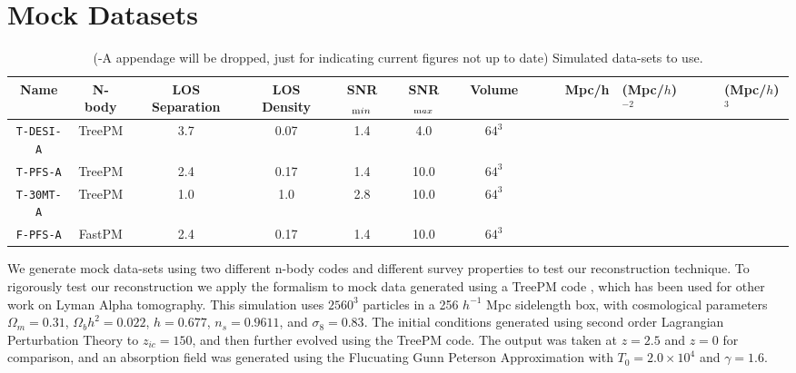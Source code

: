 \documentclass[times]{aastex62}
\begin{document}
\section{Mock Datasets}
\label{sec:mocks}
\begin{table}
  \begin{center}
    \label{tab:table1}
    \begin{tabular}{c|c|c|c|c|c|c} %
      \textbf{Name} & \textbf{N-body} & \textbf{LOS Separation} &\textbf{LOS Density} & \textbf{SNR$_{\textrm min}$} &\textbf{SNR$_{\textrm max}$} & \textbf{Volume} \ \
      &  & & Mpc/h &  (Mpc/$h$)$^{-2}$ & & & (Mpc/$h$)$^3$ \\
      \hline
    \hline
        \texttt{T-DESI-A} & TreePM & 3.7 & 0.07 & 1.4 & 4.0 & $64^3$\\
        \texttt{T-PFS-A} & TreePM & 2.4 & 0.17 & 1.4 & 10.0 & $64^3$ \\
        \texttt{T-30MT-A} & TreePM & 1.0 & 1.0 & 2.8 & 10.0 & $64^3$ \\
        \texttt{F-PFS-A} & FastPM & 2.4 & 0.17 & 1.4 & 10.0 & $64^3$\\
    \end{tabular}
        \caption{ (-A appendage will be dropped, just for indicating current figures not up to date) Simulated data-sets to use.}

  \end{center}
\end{table}

We generate mock data-sets using two different n-body codes and different survey properties to test our reconstruction technique. 
To rigorously test our reconstruction we apply the formalism to mock data generated using a TreePM code \cite{2002White,2010White}, which has been used for other work on Lyman Alpha tomography. \cite{2018Krolewski,2015StarkProtocluster,Stark2015,2015StarkProtocluster} This simulation uses $2560^3$ particles in a 256 $h^{-1}$ Mpc sidelength box, with cosmological parameters $\Omega_m = 0.31$, $\Omega_b h^2 = 0.022$, $h = 0.677$, $n_s = 0.9611$, and $\sigma_8=0.83$. The initial conditions generated using second order Lagrangian Perturbation Theory to $z_{ic}=150$, and then further evolved using the TreePM code. The output was taken at $z=2.5$ and $z=0$ for comparison, and an absorption field was generated using the Flucuating Gunn Peterson Approximation with $T_0 = 2.0 \times 10^4$ and $\gamma=1.6$.
\end{document}
